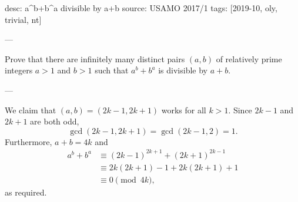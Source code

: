 desc: a^b+b^a divisible by a+b
source: USAMO 2017/1
tags: [2019-10, oly, trivial, nt]

---

Prove that there are infinitely many distinct pairs $(a, b)$ of relatively prime integers $a>1$ and $b>1$ such that $a^b+b^a$ is divisible by $a+b$.

---

We claim that $(a,b)=(2k-1,2k+1)$ works for all $k>1$. Since $2k-1$ and $2k+1$ are both odd, \[\gcd(2k-1,2k+1)=\gcd(2k-1,2)=1.\]
Furthermore, $a+b=4k$ and
\begin{align*}
    a^b+b^a&\equiv(2k-1)^{2k+1}+(2k+1)^{2k-1}\\
    &\equiv 2k(2k+1)-1+2k(2k+1)+1\\
    &\equiv 0\pmod{4k},
\end{align*}
as required.
